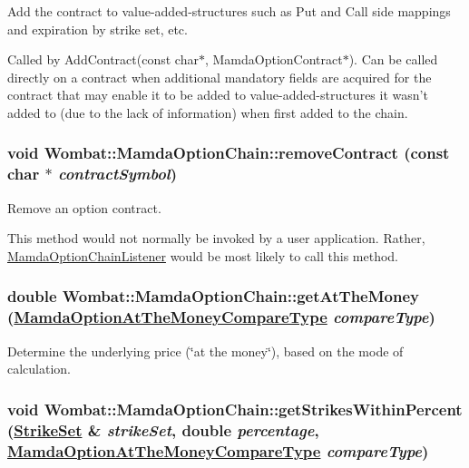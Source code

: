 Add the contract to value-added-structures such as Put and Call side mappings and expiration by strike set, etc. 

Called by Add\-Contract(const char$\ast$, Mamda\-Option\-Contract$\ast$). Can be called directly on a contract when additional mandatory fields are acquired for the contract that may enable it to be added to value-added-structures it wasn't added to (due to the lack of information) when first added to the chain. \hypertarget{classWombat_1_1MamdaOptionChain_0eed67c8d6b07d556716d25eb5c66e2a}{
\subsubsection[removeContract]{\setlength{\rightskip}{0pt plus 5cm}void Wombat::Mamda\-Option\-Chain::remove\-Contract (const char $\ast$ {\em contract\-Symbol})}}
\label{classWombat_1_1MamdaOptionChain_0eed67c8d6b07d556716d25eb5c66e2a}


Remove an option contract. 

This method would not normally be invoked by a user application. Rather, \hyperlink{classWombat_1_1MamdaOptionChainListener}{Mamda\-Option\-Chain\-Listener} would be most likely to call this method. \hypertarget{classWombat_1_1MamdaOptionChain_57a5adfcdfe5568e51707d9a84051eaa}{
\subsubsection[getAtTheMoney]{\setlength{\rightskip}{0pt plus 5cm}double Wombat::Mamda\-Option\-Chain::get\-At\-The\-Money (\hyperlink{namespaceWombat_a07b06a78fb02e1f93ee37a2d944c33a}{Mamda\-Option\-At\-The\-Money\-Compare\-Type} {\em compare\-Type})}}
\label{classWombat_1_1MamdaOptionChain_57a5adfcdfe5568e51707d9a84051eaa}


Determine the underlying price (\char`\"{}at the money\char`\"{}), based on the mode of calculation. 

\hypertarget{classWombat_1_1MamdaOptionChain_d009476aa7401aaf6cb09ddaa782f262}{
\subsubsection[getStrikesWithinPercent]{\setlength{\rightskip}{0pt plus 5cm}void Wombat::Mamda\-Option\-Chain::get\-Strikes\-Within\-Percent (\hyperlink{namespaceWombat_302d481a195bac5c9315c82cdbc79447}{Strike\-Set} \& {\em strike\-Set}, double {\em percentage}, \hyperlink{namespaceWombat_a07b06a78fb02e1f93ee37a2d944c33a}{Mamda\-Option\-At\-The\-Money\-Compare\-Type} {\em compare\-Type})}}
\label{classWombat_1_1MamdaOptionChain_d009476aa7401aaf6cb09ddaa782f262}


